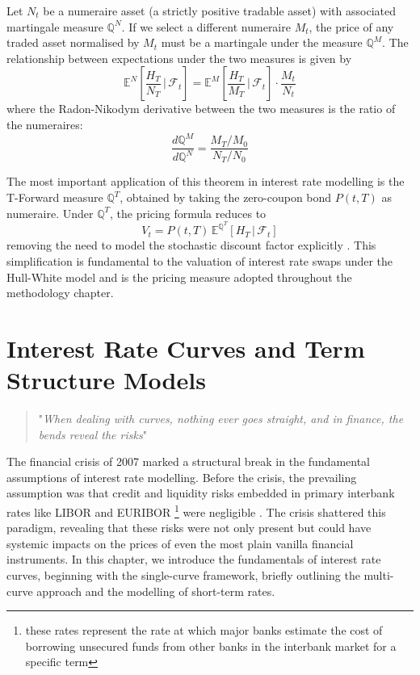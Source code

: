     \begin{definition}\label{def:GNC}
        Let $N_t$ be a numeraire asset (a strictly positive tradable asset) with associated martingale measure $\mathbb{Q}^N$. If we select a different numeraire $M_t$, the price of any traded asset normalised by $M_t$ must be a martingale under the measure $\mathbb{Q}^M$. The relationship between expectations under the two measures is given by
        \begin{equation}
            \mathbb{E}^N\!\left[ \frac{H_T}{N_T} \,\Bigg|\, \mathcal{F}_t \right] = \mathbb{E}^M\!\left[ \frac{H_T}{M_T} \,\Bigg|\, \mathcal{F}_t \right] \cdot \frac{M_t}{N_t}
        \end{equation}
        where the Radon-Nikodym derivative between the two measures is the ratio of the numeraires:
        \begin{equation*}
            \frac{d\mathbb{Q}^M}{d\mathbb{Q}^N} = \frac{M_T/M_0}{N_T/N_0}
        \end{equation*}
    \end{definition}

    \noindent
    The most important application of this theorem in interest rate modelling is the T-Forward measure $\mathbb{Q}^T$, obtained by taking the zero-coupon bond $P(t,T)$ as numeraire. Under $\mathbb{Q}^T$, the pricing formula reduces to
    \begin{equation}
        V_t = P(t,T)\,\mathbb{E}^{\mathbb{Q}^T}\!\left[ H_T \,\Big|\, \mathcal{F}_t \right]
    \end{equation}
    removing the need to model the stochastic discount factor explicitly \cite{brigo2001interest}. This simplification is fundamental to the valuation of interest rate swaps under the Hull-White model and is the pricing measure adopted throughout the methodology chapter.


\chapter{Interest Rate Curves and Term Structure Models}
    \begin{quote}
        "\textit{When dealing with curves, nothing ever goes straight, and in finance, the bends reveal the risks}" 
    \end{quote}

    \noindent 
    The financial crisis of 2007 marked a structural break in the fundamental assumptions of interest rate modelling. Before the crisis, the prevailing assumption was that credit and liquidity risks embedded in primary interbank rates like LIBOR and EURIBOR \footnote{these rates represent the rate at which major banks estimate the cost of borrowing unsecured funds from other banks in the interbank market for a specific term} were negligible \cite{Green_2016}. The crisis shattered this paradigm, revealing that these risks were not only present but could have systemic impacts on the prices of even the most plain vanilla financial instruments. In this chapter, we introduce the fundamentals of interest rate curves, beginning with the single-curve framework, briefly outlining the multi-curve approach and the modelling of short-term rates. \\

